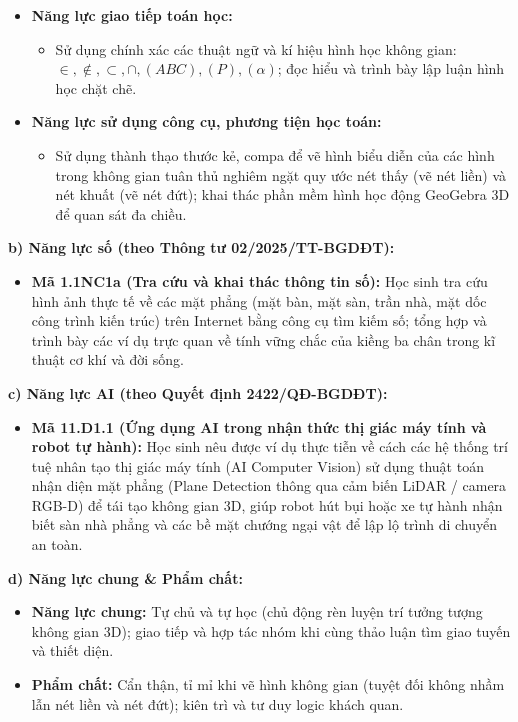 \documentclass[12pt, a4paper]{article}
\begin{document}
\begin{itemize}[leftmargin=1.5em]
\begin{itemize}
    \end{itemize}
    \item \textbf{Năng lực giao tiếp toán học:}
    \begin{itemize}
        \item Sử dụng chính xác các thuật ngữ và kí hiệu hình học không gian: $\in, \notin, \subset, \cap, (ABC), (P), (\alpha)$; đọc hiểu và trình bày lập luận hình học chặt chẽ.
    \end{itemize}
    \item \textbf{Năng lực sử dụng công cụ, phương tiện học toán:}
    \begin{itemize}
        \item Sử dụng thành thạo thước kẻ, compa để vẽ hình biểu diễn của các hình trong không gian tuân thủ nghiêm ngặt quy ước nét thấy (vẽ nét liền) và nét khuất (vẽ nét đứt); khai thác phần mềm hình học động GeoGebra 3D để quan sát đa chiều.
    \end{itemize}
\end{itemize}

\textbf{b) Năng lực số (theo Thông tư 02/2025/TT-BGDĐT):}
\begin{itemize}[leftmargin=1.5em]
    \item \textbf{Mã 1.1NC1a (Tra cứu và khai thác thông tin số):} Học sinh tra cứu hình ảnh thực tế về các mặt phẳng (mặt bàn, mặt sàn, trần nhà, mặt dốc công trình kiến trúc) trên Internet bằng công cụ tìm kiếm số; tổng hợp và trình bày các ví dụ trực quan về tính vững chắc của kiềng ba chân trong kĩ thuật cơ khí và đời sống.
\end{itemize}

\textbf{c) Năng lực AI (theo Quyết định 2422/QĐ-BGDĐT):}
\begin{itemize}[leftmargin=1.5em]
    \item \textbf{Mã 11.D1.1 (Ứng dụng AI trong nhận thức thị giác máy tính và robot tự hành):} Học sinh nêu được ví dụ thực tiễn về cách các hệ thống trí tuệ nhân tạo thị giác máy tính (AI Computer Vision) sử dụng thuật toán nhận diện mặt phẳng (Plane Detection thông qua cảm biến LiDAR / camera RGB-D) để tái tạo không gian 3D, giúp robot hút bụi hoặc xe tự hành nhận biết sàn nhà phẳng và các bề mặt chướng ngại vật để lập lộ trình di chuyển an toàn.
\end{itemize}

\textbf{d) Năng lực chung \& Phẩm chất:}
\begin{itemize}[leftmargin=1.5em]
    \item \textbf{Năng lực chung:} Tự chủ và tự học (chủ động rèn luyện trí tưởng tượng không gian 3D); giao tiếp và hợp tác nhóm khi cùng thảo luận tìm giao tuyến và thiết diện.
    \item \textbf{Phẩm chất:} Cẩn thận, tỉ mỉ khi vẽ hình không gian (tuyệt đối không nhầm lẫn nét liền và nét đứt); kiên trì và tư duy logic khách quan.
\end{itemize}
\end{document}
